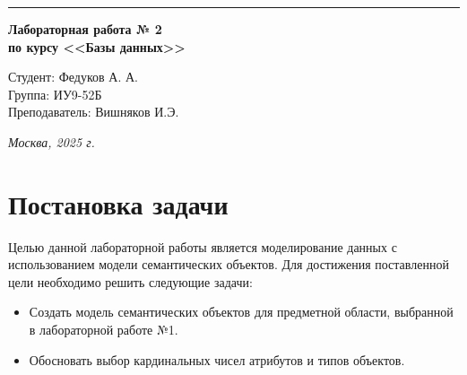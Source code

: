 \documentclass[a4paper, 14pt]{extarticle}
\begin{document}
\begin{titlepage}
\vspace*{-16pt}
\hspace{30pt}\rule{0.866\textwidth}{0.4pt}
  
\vspace{11em}

\begin{center}
\Large {\bf Лабораторная работа № 2} \\ 
\large {\bf по курсу <<Базы данных>>} \\

\end{center}\normalsize

\vspace{8em}


\begin{flushright}
 \begin{minipage}{0.5\linewidth}
      {Студент: Федуков А. А. \hspace*{15pt}\\ 
      Группа: ИУ9-52Б \\ 
      Преподаватель: Вишняков И.Э. \hspace*{15pt}}
  \end{minipage}
\end{flushright}
\bigskip
\vfill
\begin{center}
\textsl{Москва, 2025 г.}
\end{center}
\end{titlepage}


\setlength{\tabcolsep}{3pt}
\setcounter{page}{2}

{
  \hypersetup{linkcolor=black}
  \tableofcontents
}

\section*{Постановка задачи}\label{Sect::goal}
Целью данной лабораторной работы является моделирование данных с использованием модели семантических объектов.
Для достижения поставленной цели необходимо решить следующие задачи:
\begin{itemize}
    \item  Создать модель семантических объектов для
предметной области, выбранной в
лабораторной работе №1. 
    \item  Обосновать выбор кардинальных чисел
атрибутов и типов объектов.
\end{itemize}
\end{document}
